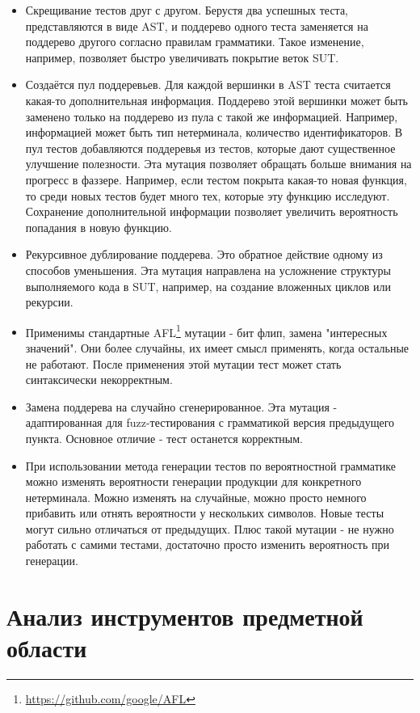 \documentclass[a4paper]{article}
\begin{document}
\begin{itemize}
\item Скрещивание тестов друг с другом. Берустя два успешных теста, представляются в виде AST, и поддерево одного теста заменяется на поддерево другого согласно правилам грамматики. Такое изменение, например, позволяет быстро увеличивать покрытие веток SUT.   
\item Создаётся пул поддеревьев. Для каждой вершинки в AST теста считается  какая-то дополнительная информация. Поддерево этой вершинки может быть заменено только на поддерево из пула с такой же информацией. Например, информацией может быть тип нетерминала, количество идентификаторов. В пул тестов добавляются поддеревья из тестов, которые дают существенное улучшение полезности. Эта мутация позволяет обращать больше внимания на прогресс в фаззере. Например, если тестом покрыта какая-то новая функция, то среди новых тестов будет много тех, которые эту функцию исследуют. Сохранение дополнительной информации позволяет увеличить вероятность попадания в новую функцию.
\item Рекурсивное дублирование поддерева. Это обратное действие одному из способов уменьшения. Эта мутация направлена на усложнение структуры выполняемого кода в SUT, например, на создание вложенных циклов или рекурсии. 
\item Применимы стандартные AFL\footnote[1]{\href{https://github.com/google/AFL}{https://github.com/google/AFL}} мутации - бит флип, замена "интересных значений". Они более случайны, их имеет смысл применять, когда остальные не работают. После применения этой мутации тест может стать синтаксически некорректным.
\item Замена поддерева на случайно сгенерированное. Эта мутация - адаптированная для fuzz-тестирования с грамматикой версия предыдущего пункта. Основное отличие - тест останется корректным.
\item При использовании метода генерации тестов по вероятностной грамматике можно изменять вероятности генерации продукции для конкретного нетерминала. Можно изменять на случайные, можно просто немного прибавить или отнять вероятности у нескольких символов. Новые тесты могут сильно отличаться от предыдущих. Плюс такой мутации - не нужно работать с самими тестами, достаточно просто изменить вероятность при генерации.  
\end{itemize}


\newpage
\section{Анализ инструментов предметной области}
\indent
\end{document}
